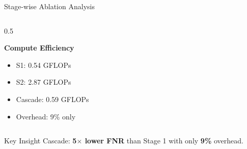 \documentclass[aspectratio=169,12pt]{beamer}
\newcommand{\highlight}[1]{\textcolor{primaryblue}{\textbf{#1}}}
\newcommand{\successtext}[1]{\textcolor{successgreen}{\textbf{#1}}}
\begin{document}
\begin{frame}{Stage-wise Ablation Analysis}
\begin{columns}[T]
\begin{column}{0.5\textwidth}
\begin{center}
\end{center}

\vspace{-0.2em}
\textbf{Compute Efficiency}
\begin{itemize}
\setlength\itemsep{0.02em}
    \item S1: 0.54 GFLOPs
    \item S2: 2.87 GFLOPs
    \item Cascade: 0.59 GFLOPs
    \item Overhead: 9\% only
\end{itemize}
\end{column}
\end{columns}

\vspace{0.05em}
\begin{block}{\tiny Key Insight}
Cascade: \successtext{5$\times$ lower FNR} than Stage 1 \quad with only \highlight{9\%} overhead.
\end{block}
\end{frame}
\end{document}
